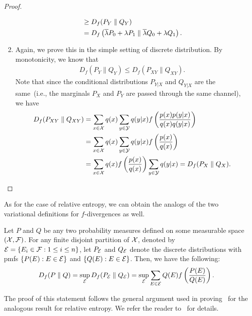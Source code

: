 \begin{proof}
\begin{enumerate}[label=(\alph*)]
\begin{align}
                    & \geq D_f(P_Y \parallel Q_Y) \\
                    & = D_f \left( \overline{\lambda} P_0 + \lambda P_1 \parallel \overline{\lambda} Q_0 + \lambda Q_1 \right). 
                \end{align}
                \item Again, we prove this in the simple setting of discrete distribution. By monotonicity, we know that 
                \begin{align}
                    D_f(P_{Y} \parallel Q_Y) \leq D_f(P_{XY} \parallel Q_{XY}). 
                \end{align}
                Note that since the conditional distributions $P_{Y|X}$ and $Q_{Y|X}$ are the same~(i.e., the marginals $P_X$ and $P_Y$ are passed through the same channel), we have 
                \begin{align}
                    D_f(P_{XY} \parallel Q_{XY}) &= \sum_{x \in \mathcal{X}}q(x) \sum_{y \in \mathcal{Y}} q(y|x) f \left( \frac{p(x) p(y|x)}{q(x)q(y|x)} \right)  \\
                    &= \sum_{x \in \mathcal{X}}q(x)  \sum_{y \in \mathcal{Y}} q(y|x)  f \left( \frac{p(x)}{q(x)} \right) \\
                    &= \sum_{x \in \mathcal{X}}q(x) f \left( \frac{p(x)}{q(x)} \right) \sum_{y \in \mathcal{Y}} q(y|x)   = D_f(P_X \parallel Q_X). 
                \end{align}
            \end{enumerate}
        \end{proof}
        
        
        As for the case of relative entropy, we can obtain the analogs of the two variational definitions for $f$-divergences as well. 

        \begin{theorem}
            \label{thm:f-div-var-def-1}   Let $P$ and $Q$ be any two probability measures defined on some measurable space $(\mathcal{X}, \mathcal{F})$. For any finite disjoint partition of $\mathcal{X}$, denoted by $\mathcal{E} = \{E_i \in \mathcal{F}: 1 \leq i \leq n\}$, let $P_{\mathcal{E}}$ and $Q_{\mathcal{E}}$ denote the discrete distributions with pmfs $\{P(E): E \in \mathcal{E}\}$ and $\{Q(E): E \in \mathcal{E}\}$. Then, we have the following: 
            \begin{align}
                D_f(P \parallel Q) = \sup_{\mathcal{E}} D_f(P_{\mathcal{E}} \parallel Q_{\mathcal{E}})  = \sup_{\mathcal{E}} \sum_{E \in \mathcal{E}} Q(E) f\left( \frac{P(E)}{Q(E)} \right). 
            \end{align}
        \end{theorem}
        The proof of this statement follows the general argument used in proving~ for the analogous result for relative entropy. We refer the reader to~\citet[\S~7.14]{polyanskiy2023ITbook} for details. 
        
